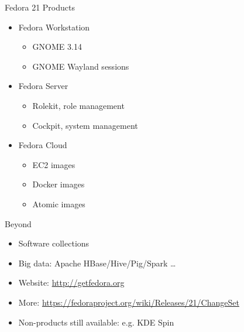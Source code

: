 \begin{frame}{Fedora 21 Products}
  \begin{itemize}
    \item Fedora Workstation
      \begin{itemize}
        \item GNOME 3.14
        \item GNOME Wayland sessions
      \end{itemize}
    \item Fedora Server
      \begin{itemize}
        \item Rolekit, role management
        \item Cockpit, system management
      \end{itemize}
    \item Fedora Cloud
      \begin{itemize}
        \item EC2 images
        \item Docker images
        \item Atomic images
      \end{itemize}
  \end{itemize}
\end{frame}

\begin{frame}{Beyond}
  \begin{itemize}
    \item Software collections
    \item Big data: Apache HBase/Hive/Pig/Spark \ldots
    \item Website: \url{http://getfedora.org}
    \item More: \url{https://fedoraproject.org/wiki/Releases/21/ChangeSet}
    \item Non-products still available: e.g. KDE Spin
  \end{itemize}
\end{frame}
